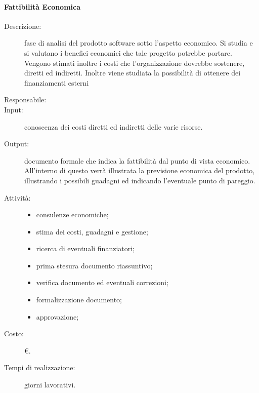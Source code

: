 \paragraph{Fattibilità Economica}
\begin{description}
\item[Descrizione:] fase di analisi del prodotto software sotto l'aspetto economico. Si studia e si valutano i benefici economici che tale progetto potrebbe portare. Vengono stimati inoltre i costi che l'organizzazione dovrebbe sostenere, diretti ed indiretti. Inoltre viene studiata la possibilità di ottenere dei finanziamenti esterni 
\item[Responsabile:] 
\item[Input:] conoscenza dei costi diretti ed indiretti delle varie risorse.
\item[Output:] documento formale che indica la fattibilità dal punto di vista economico. All'interno di questo verrà illustrata la previsione economica del prodotto, illustrando i possibili guadagni ed indicando l'eventuale punto di pareggio.
\item[Attività:]
\begin{itemize}
\item consulenze economiche;
\item stima dei costi, guadagni e gestione;
\item ricerca di eventuali finanziatori;
\item prima stesura documento riassuntivo;
\item verifica documento ed eventuali correzioni;
\item formalizzazione documento;
\item approvazione;
\end{itemize}
\item[Costo:] \euro.
\item[Tempi di realizzazione:]  giorni lavorativi.
\end{description}

